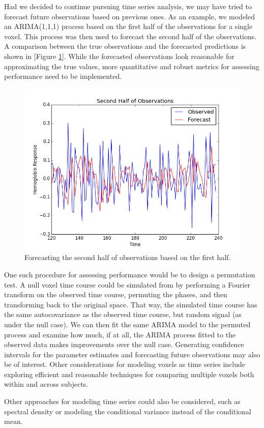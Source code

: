 \par Had we decided to continue pursuing time series analysis, we may have 
tried to forecast future observations based on previous ones. As an example, 
we modeled an ARIMA(1,1,1) process based on the first half of the 
observations for a single voxel. This process was then used to forecast the 
second half of the observations. A comparison between the true observations 
and the forecasted predictions is shown in [Figure \ref{fig:ts-preds}]. 
While the forecasted observations look reasonable for approximating the true 
values, more quantitative and robust metrics for assessing performance need 
to be implemented. 

\begin{figure}[ht]
\centering
\includegraphics[scale=0.5]{../images/ts-preds.png}
\caption{Forecasting the second half of observations based on the first 
half.}
\label{fig:ts-preds}
\end{figure}

\par One such procedure for assessing performance would be to design a 
permutation test. A null voxel time course could be simulated from by 
performing a Fourier transform on the observed time course, permuting the 
phases, and then transforming back to the original space. That way, the 
simulated time course has the same autocovariance as the observed time 
course, but random signal (as under the null case). We can then fit the 
same ARIMA model to the permuted process and examine how much, if at all, 
the ARIMA process fitted to the observed data makes improvements over the 
null case. Generating confidence intervals for the parameter estimates and 
forecasting future observations may also be of interest. Other considerations 
for modeling voxels as time series include exploring efficient and 
reasonable techniques for comparing multiple voxels both within and across 
subjects. 

\par Other approaches for modeling time series could also be considered, 
such as spectral density or modeling the conditional variance instead of the 
conditional mean. 




